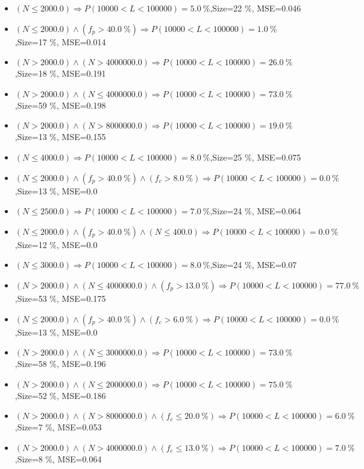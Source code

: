 \documentclass[numbered]{CSL}
\begin{document}
\begin{itemize}
\item $(N \leq 2000.0) \Rightarrow P(10 000 < L < 100 000) = 5.0~\%$,\hfill Size=22 \%, MSE=0.046
\item $(N \leq 2000.0) \land (f_p > 40.0~\%) \Rightarrow P(10 000 < L < 100 000) = 1.0~\%$,\hfill Size=17 \%, MSE=0.014
\item $(N > 2000.0) \land (N > 4000000.0) \Rightarrow P(10 000 < L < 100 000) = 26.0~\%$,\hfill Size=18 \%, MSE=0.191
\item $(N > 2000.0) \land (N \leq 4000000.0) \Rightarrow P(10 000 < L < 100 000) = 73.0~\%$,\hfill Size=59 \%, MSE=0.198
\item $(N > 2000.0) \land (N > 8000000.0) \Rightarrow P(10 000 < L < 100 000) = 19.0~\%$,\hfill Size=13 \%, MSE=0.155
\item $(N \leq 4000.0) \Rightarrow P(10 000 < L < 100 000) = 8.0~\%$,\hfill Size=25 \%, MSE=0.075
\item $(N \leq 2000.0) \land (f_p > 40.0~\%) \land (f_c > 8.0~\%) \Rightarrow P(10 000 < L < 100 000) = 0.0~\%$,\hfill Size=13 \%, MSE=0.0
\item $(N \leq 2500.0) \Rightarrow P(10 000 < L < 100 000) = 7.0~\%$,\hfill Size=24 \%, MSE=0.064
\item $(N \leq 2000.0) \land (f_p > 40.0~\%) \land (N \leq 400.0) \Rightarrow P(10 000 < L < 100 000) = 0.0~\%$,\hfill Size=12 \%, MSE=0.0
\item $(N \leq 3000.0) \Rightarrow P(10 000 < L < 100 000) = 8.0~\%$,\hfill Size=24 \%, MSE=0.07
\item $(N > 2000.0) \land (N \leq 4000000.0) \land (f_p > 13.0~\%) \Rightarrow P(10 000 < L < 100 000) = 77.0~\%$,\hfill Size=53 \%, MSE=0.175
\item $(N \leq 2000.0) \land (f_p > 40.0~\%) \land (f_c > 6.0~\%) \Rightarrow P(10 000 < L < 100 000) = 0.0~\%$,\hfill Size=13 \%, MSE=0.0
\item $(N > 2000.0) \land (N \leq 3000000.0) \Rightarrow P(10 000 < L < 100 000) = 73.0~\%$,\hfill Size=58 \%, MSE=0.196
\item $(N > 2000.0) \land (N \leq 2000000.0) \Rightarrow P(10 000 < L < 100 000) = 75.0~\%$,\hfill Size=52 \%, MSE=0.186
\item $(N > 2000.0) \land (N > 8000000.0) \land (f_c \leq 20.0~\%) \Rightarrow P(10 000 < L < 100 000) = 6.0~\%$,\hfill Size=7 \%, MSE=0.053
\item $(N > 2000.0) \land (N > 4000000.0) \land (f_c \leq 13.0~\%) \Rightarrow P(10 000 < L < 100 000) = 7.0~\%$,\hfill Size=8 \%, MSE=0.064

\end{itemize}
\end{document}
